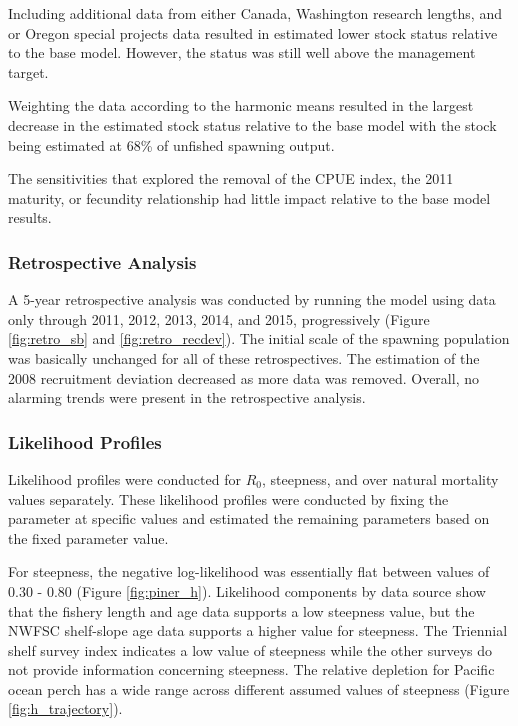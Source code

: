 \documentclass[12pt,]{article}
\begin{document}
Including additional data from either Canada, Washington research
lengths, and or Oregon special projects data resulted in estimated lower
stock status relative to the base model. However, the status was still
well above the management target.

Weighting the data according to the harmonic means resulted in the
largest decrease in the estimated stock status relative to the base
model with the stock being estimated at 68\% of unfished spawning
output.

The sensitivities that explored the removal of the CPUE index, the 2011
maturity, or fecundity relationship had little impact relative to the
base model results.

\subsubsection{Retrospective Analysis}\label{retrospective-analysis}

A 5-year retrospective analysis was conducted by running the model using
data only through 2011, 2012, 2013, 2014, and 2015, progressively
(Figure \ref{fig:retro_sb} and \ref{fig:retro_recdev}). The initial
scale of the spawning population was basically unchanged for all of
these retrospectives. The estimation of the 2008 recruitment deviation
decreased as more data was removed. Overall, no alarming trends were
present in the retrospective analysis.

\subsubsection{Likelihood Profiles}\label{likelihood-profiles}

Likelihood profiles were conducted for \(R_0\), steepness, and over
natural mortality values separately. These likelihood profiles were
conducted by fixing the parameter at specific values and estimated the
remaining parameters based on the fixed parameter value.

For steepness, the negative log-likelihood was essentially flat between
values of 0.30 - 0.80 (Figure \ref{fig:piner_h}). Likelihood components
by data source show that the fishery length and age data supports a low
steepness value, but the NWFSC shelf-slope age data supports a higher
value for steepness. The Triennial shelf survey index indicates a low
value of steepness while the other surveys do not provide information
concerning steepness. The relative depletion for Pacific ocean perch has
a wide range across different assumed values of steepness (Figure
\ref{fig:h_trajectory}).
\end{document}
